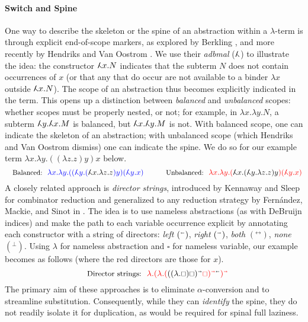 \documentclass[a4paper,UKenglish,cleveref, autoref]{lipics-v2019}
\newcommand\adbmal{\reflectbox{$\lambda$}}
\newcommand\red{\color{red}}
\newcommand\blue{\color{blue}}
\newcommand\black{\color{black}}
\newcommand\dirL{{\scriptscriptstyle\shortleftarrow}}
\newcommand\dirR{{\scriptscriptstyle\shortrightarrow}}
\newcommand\dirRL{{\scriptscriptstyle\leftrightarrow}}
\newcommand\dirSTOP{{\scriptscriptstyle\bot}}
\newcommand\var{{\scriptstyle\square}}
\begin{document}
\paragraph*{Switch and Spine}

One way to describe the skeleton or the spine of an abstraction within a $\lambda$-term is through explicit end-of-scope markers, as explored by Berkling \cite{berkling1976symmetric,BERKLING198289}, and more recently by Hendriks and Van Oostrom \cite{hendriks2003lambda}. We use their \emph{adbmal} ($\adbmal$) to illustrate the idea: the constructor $\adbmal x.N$ indicates that the subterm $N$ does not contain occurrences of $x$ (or that any that do occur are not available to a binder $\lambda x$ outside $\adbmal x.N$). The scope of an abstraction thus becomes explicitly indicated in the term. This opens up a distinction between \emph{balanced} and \emph{unbalanced} scopes: whether scopes must be properly nested, or not; for example, in $\lambda x.\lambda y.N$, a subterm $\adbmal y.\adbmal x.M$ is balanced, but $\adbmal x.\adbmal y.M$ is not. With balanced scope, one can indicate the skeleton of an abstraction; with unbalanced scope (which Hendriks and Van Oostrom dismiss) one can indicate the spine. We do so for our example term $\lambda x.\lambda y.((\lambda z.z)y)x$ below. 
%
\[
\text{\small Balanced:}
~~{\blue\lambda x. \lambda y. ((\adbmal y.({\black\adbmal x.\lambda z.z})y)(\adbmal y.x)}
\qquad
\text{\small Unbalanced:}
~~{\red\lambda x. \lambda y. ({\black\adbmal x. (\adbmal y.\lambda z.z)y})(\adbmal y.x)}
\]
%
A closely related approach is \emph{director strings}, introduced by Kennaway and Sleep \cite{kennaway1988director} for combinator reduction and generalized to any reduction strategy by Fern\'{a}ndez, Mackie, and Sinot in \cite{fernandez2005lambda}. The idea is to use nameless abstractions (as with  DeBruijn indices) and make the path to each variable occurrence explicit by  annotating each constructor with a string of directors: \emph{left} $(^\dirL)$, \emph{right} $(^\dirR)$, \emph{both} $(^\dirRL)$, \emph{none} $(^\dirSTOP)$. Using $\lambda$ for nameless abstraction and $\var$ for nameless variable, our example becomes as follows (where the red directors are those for $x$).
\[
\text{\small Director strings:}~~\red\lambda.(\lambda.({\black((\lambda.\var)\var)^\dirR}\var)^{\dirR\black\dirL})^\dirR
\]
The primary aim of these approaches is to eliminate $\alpha$-conversion and to streamline substitution. Consequently, while they can \emph{identify} the spine, they do not readily isolate it for duplication, as would be required for spinal full laziness.
\end{document}
